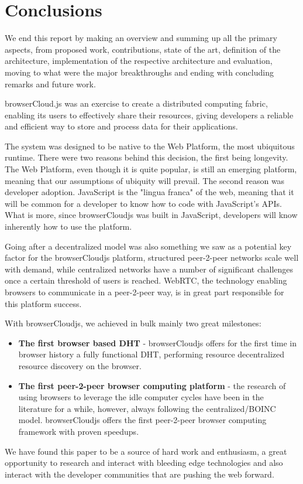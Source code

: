 
\section{Conclusions}

We end this report by making an overview and summing up all the primary aspects, from proposed work, contributions, state of the art, definition of the architecture, implementation of the respective architecture and evaluation, moving to what were the major breakthroughs and ending with concluding remarks and future work.

browserCloud.js was an exercise to create a distributed computing fabric, enabling its users to effectively share their resources, giving developers a reliable and efficient way to store and process data for their applications.

The system was designed to be native to the Web Platform, the most ubiquitous runtime. There were two reasons behind this decision, the first being longevity. The Web Platform, even though it is quite popular, is still an emerging platform, meaning that our assumptions of ubiquity will prevail. The second reason was developer adoption. JavaScript is the "lingua franca" of the web, meaning that it will be common for a developer to know how to code with JavaScript's APIs. What is more, since browserCloudjs was built in JavaScript, developers will know inherently how to use the platform.

Going after a decentralized model was also something we saw as a potential key factor for the browserCloudjs platform, structured peer-2-peer networks scale well with demand, while centralized networks have a number of significant challenges once a certain threshold of users is reached. WebRTC, the technology enabling browsers to communicate in a peer-2-peer way, is in great part responsible for this platform success.

With browserCloudjs, we achieved in bulk mainly two great milestones:

\begin{itemize}
  \item \textbf{The first browser based DHT} - browserCloudjs offers for the first time in browser history a fully functional DHT, performing resource decentralized resource discovery on the browser. 
  \item \textbf{The first peer-2-peer browser computing platform} - the research of using browsers to leverage the idle computer cycles have been in the literature for a while, however, always following the centralized/BOINC model. browserCloudjs offers the first peer-2-peer browser computing framework with proven speedups.
\end{itemize}

We have found this paper to be a source of hard work and enthusiasm, a great opportunity to research and interact with bleeding edge technologies and also interact with the developer communities that are pushing the web forward.

